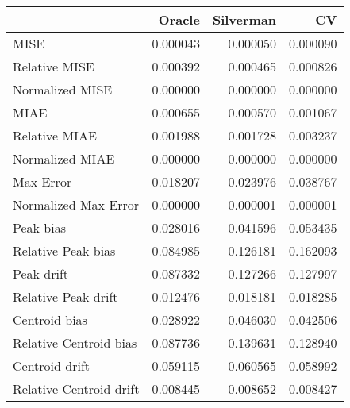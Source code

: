 \begin{tabular}{lrrr}
  \hline
 & Oracle & Silverman & CV \\ 
  \hline
MISE & 0.000043 & 0.000050 & 0.000090 \\ 
  Relative MISE & 0.000392 & 0.000465 & 0.000826 \\ 
  Normalized MISE & 0.000000 & 0.000000 & 0.000000 \\ 
  MIAE & 0.000655 & 0.000570 & 0.001067 \\ 
  Relative MIAE & 0.001988 & 0.001728 & 0.003237 \\ 
  Normalized MIAE & 0.000000 & 0.000000 & 0.000000 \\ 
  Max Error & 0.018207 & 0.023976 & 0.038767 \\ 
  Normalized Max Error & 0.000000 & 0.000001 & 0.000001 \\ 
  Peak bias & 0.028016 & 0.041596 & 0.053435 \\ 
  Relative Peak bias & 0.084985 & 0.126181 & 0.162093 \\ 
  Peak drift & 0.087332 & 0.127266 & 0.127997 \\ 
  Relative Peak drift & 0.012476 & 0.018181 & 0.018285 \\ 
  Centroid bias & 0.028922 & 0.046030 & 0.042506 \\ 
  Relative Centroid bias & 0.087736 & 0.139631 & 0.128940 \\ 
  Centroid drift & 0.059115 & 0.060565 & 0.058992 \\ 
  Relative Centroid drift & 0.008445 & 0.008652 & 0.008427 \\ 
   \hline
\end{tabular}
